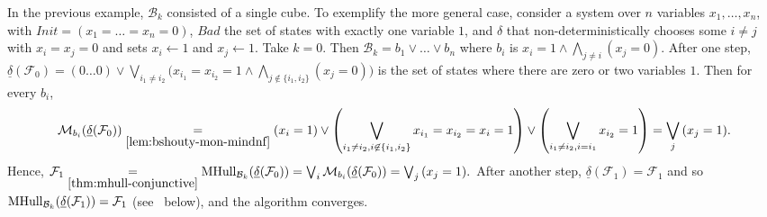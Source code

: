 \documentclass[acmsmall,screen]{acmart}
\newcommand{\Init}{{\textit{Init}}}
\newcommand{\Bad}{\textit{Bad}}
\newcommand{\tr}{\delta}
\newcommand{\Frame}{\mathcal{F}}
\newcommand{\set}[1]{\{{#1}\}}
\newcommand{\reflextr}[1]{\underline{#1}}
\newcommand{\postimage}[2]{{\reflextr{#1}}({#2})}
\newcommand{\bkwrch}[1]{\mathcal{B}_{#1}}
\newcommand{\monox}[2]{\mathcal{M}_{#2}({#1})}
\newcommand{\mhull}[2]{{\rm MHull}_{#2}({#1})}
\newcommand{\bkcube}{b}
\begin{document}
\begin{example}
\label{ex:monotone-several-cubes}
In the previous example, $\bkwrch{k}$ consisted of a single cube. To exemplify the more general case, consider a system over $n$ variables $x_1,\ldots,x_n$, with $\Init = (x_1=\ldots=x_n=0)$, $\Bad$ the set of states with exactly one variable $1$, and $\tr$ that non-deterministically chooses some $i \neq j$ with $x_i=x_j=0$ and sets $x_i \gets 1$ and $x_j \gets 1$.
Take $k=0$. Then $\bkwrch{k}=\bkcube_1 \lor \ldots \lor \bkcube_n$ where $\bkcube_i$ is $x_i=1 \land \bigwedge_{j \neq i}{(x_j=0)}$.
After one step, $\postimage{\tr}{\Frame_0} = (0\ldots0) \lor \bigvee_{i_1 \neq i_2}{(x_{i_1}=x_{i_2}=1 \land \bigwedge_{j \not\in \set{i_1,i_2}}(x_j=0)})$ is the set of states where there are zero or two variables $1$.
Then for every $b_i$,
\begin{align*}
		\monox{\postimage{\tr}{\Frame_0}}{b_i}
	\underset{\rm \Cref{lem:bshouty-mon-mindnf}}{=}
			(x_i=1)
		\lor
			\left(\bigvee_{i_1 \neq i_2, i\not\in \set{i_1,i_2}}{x_{i_1}=x_{i_2}=x_i=1}\right)
		\lor
			\left(\bigvee_{i_1 \neq i_2, i=i_1}{x_{i_2}=1}\right)
	= \bigvee_{j}{(x_j=1)}.
\end{align*}
Hence,
$
		\Frame_1 \underset{\rm \Cref{thm:mhull-conjunctive}}{=} \mhull{\postimage{\tr}{\Frame_0}}{\bkwrch{k}} = \bigvee_{i}{\monox{\postimage{\tr}{\Frame_0}}{b_i}} = \bigvee_{j}{(x_j=1)}.
$
After another step, $\postimage{\tr}{\Frame_1}=\Frame_1$ and so $\mhull{\postimage{\tr}{\Frame_1}}{\bkwrch{k}} = \Frame_1$ (see~ below), and the algorithm converges.
%
%
\end{example}
\end{document}
